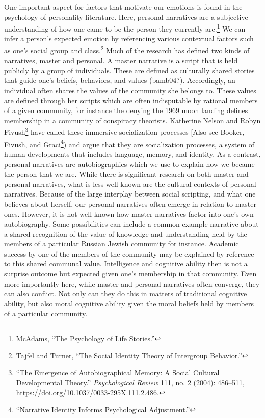 \documentclass[
  12pt,
]{book}
\theoremstyle{definition}
\theoremstyle{definition}
\theoremstyle{definition}
\theoremstyle{definition}
\theoremstyle{remark}
\begin{document}
One important aspect for factors that motivate our emotions is found in the psychology of personality literature. Here, personal narratives are a subjective understanding of how one came to be the person they currently are.\footnote{McAdams, {``The {Psychology} of {Life Stories}.''}} We can infer a person's expected emotion by referencing various contextual factors such as one's social group and class.\footnote{Tajfel and Turner, {``The {Social Identity Theory} of {Intergroup Behavior}.''}} Much of the research has defined two kinds of narratives, master and personal. A master narrative is a script that is held publicly by a group of individuals. These are defined as culturally shared stories that guide one's beliefs, behaviors, and values (bamb04?). Accordingly, an individual often shares the values of the community she belongs to. These values are defined through her scripts which are often indisputable by rational members of a given community, for instance the denying the 1969 moon landing defines membership in a community of conspiracy theorists. Katherine Nelson and Robyn Fivush\footnote{{``The {Emergence} of {Autobiographical Memory}: {A Social Cultural Developmental Theory}.''} \emph{Psychological Review} 111, no. 2 (2004): 486--511, \url{https://doi.org/10.1037/0033-295X.111.2.486}.} have called these immersive socialization processes {[}Also see Booker, Fivush, and Graci\footnote{{``Narrative Identity Informs Psychological Adjustment.''}}) and argue that they are socialization processes, a system of human developments that includes language, memory, and identity. As a contrast, personal narratives are autobiographies which we use to explain how we became the person that we are. While there is significant research on both master and personal narratives, what is less well known are the cultural contexts of personal narratives. Because of the large interplay between social scripting, and what one believes about herself, our personal narratives often emerge in relation to master ones. However, it is not well known how master narratives factor into one's own autobiography. Some possibilities can include a common example narrative about a shared recognition of the value of knowledge and understanding held by the members of a particular Russian Jewish community for instance. Academic success by one of the members of the community may be explained by reference to this shared communal value. Intelligence and cognitive ability then is not a surprise outcome but expected given one's membership in that community. Even more importantly here, while master and personal narratives often converge, they can also conflict. Not only can they do this in matters of traditional cognitive ability, but also moral cognitive ability given the moral beliefs held by members of a particular community.
\end{document}
